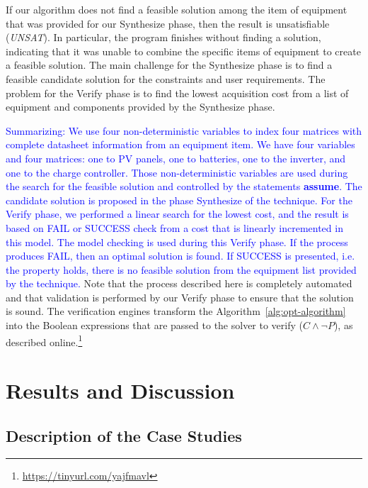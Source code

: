 \documentclass[runningheads]{llncs}
\begin{document}
If our algorithm does not find a feasible solution among the item of equipment that was provided for our {\sc Synthesize} phase, then the result is unsatisfiable (\textit{UNSAT}). In particular, the program finishes without finding a solution, indicating that it was unable to combine the specific items of equipment to create a feasible solution. 
%
The main challenge for the {\sc Synthesize} phase is to find a feasible candidate solution for the constraints and user requirements. The problem for the {\sc Verify} phase is to find the lowest acquisition cost from a list of equipment and components provided by the {\sc Synthesize} phase. 

\textcolor{blue}{Summarizing: We use four non-deterministic variables to index four matrices with complete datasheet information from an equipment item. We have four variables and four matrices: one to PV panels, one to batteries, one to the inverter, and one to the charge controller. Those non-deterministic variables are used during the search for the feasible solution and controlled by the statements \textbf{assume}. The candidate solution is proposed in the phase {\sc Synthesize} of the technique. For the {\sc Verify} phase, we performed a linear search for the lowest cost, and the result is based on FAIL or SUCCESS check from a cost that is linearly incremented in this model. The model checking is used during this {\sc Verify} phase. If the process produces FAIL, then an optimal solution is found. If SUCCESS is presented, i.e. the property holds, there is no feasible solution from the equipment list provided by the technique.}
%
Note that the process described here is completely automated and that validation is performed by our {\sc Verify} phase to ensure that the solution is sound.
The verification engines transform the Algorithm~\ref{alg:opt-algorithm} into the Boolean expressions that are passed to the solver to verify ($C \wedge \neg P$), as described online.\footnote{\url{https://tinyurl.com/yajfmavl}}

\section{Results and Discussion}
\subsection{Description of the Case Studies}
\end{document}
